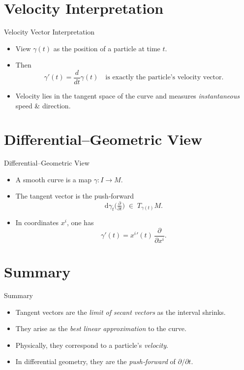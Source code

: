 \documentclass[11pt,openany]{article}
\begin{document}
\section{Velocity Interpretation}
\begin{frame}{Velocity Vector Interpretation}
	\begin{itemize}
		\item View $\gamma(t)$ as the position of a particle at time $t$.
		\item Then
		\[
		\gamma'(t)
		= \frac{d}{dt}\gamma(t)
		\quad\text{is exactly the particle's velocity vector.}
		\]
		\item Velocity lies in the tangent space of the curve and measures \emph{instantaneous} speed \& direction.
	\end{itemize}
\end{frame}

\section{Differential–Geometric View}
\begin{frame}{Differential–Geometric View}
	\begin{itemize}
		\item A smooth curve is a map $\gamma\colon I\to M$.
		\item The tangent vector is the push‐forward
		\[
		\mathrm{d}\gamma_t\bigl(\tfrac{\partial}{\partial t}\bigr)
		\;\in\;T_{\gamma(t)}M.
		\]
		\item In coordinates $x^i$, one has
		\[
		\gamma'(t)
		= x^i{}'(t)\,\frac{\partial}{\partial x^i}.
		\]
	\end{itemize}
\end{frame}

\section{Summary}
\begin{frame}{Summary}
	\begin{itemize}
		\item Tangent vectors are the \emph{limit of secant vectors} as the interval shrinks.
		\item They arise as the \emph{best linear approximation} to the curve.
		\item Physically, they correspond to a particle's \emph{velocity}.
		\item In differential geometry, they are the \emph{push‐forward} of $\partial/\partial t$.
	\end{itemize}
\end{frame}
\end{document}

